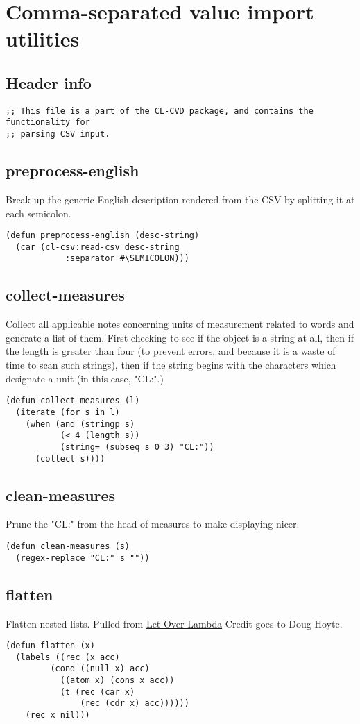 \documentclass[11pt]{article}
\begin{document}
\section{Comma-separated value import utilities}
\label{sec-3}
\subsection{Header info}
\label{sec-3-1}
\begin{verbatim}
;; This file is a part of the CL-CVD package, and contains the functionality for
;; parsing CSV input.
\end{verbatim}
\subsection{preprocess-english}
\label{sec-3-2}
Break up the generic English description rendered from the CSV by
splitting it at each semicolon.
\begin{verbatim}
(defun preprocess-english (desc-string)
  (car (cl-csv:read-csv desc-string
			:separator #\SEMICOLON)))
\end{verbatim}
\subsection{collect-measures}
\label{sec-3-3}
Collect all applicable notes concerning units of measurement related to words
and generate a list of them. First checking to see if the object is a string at
all, then if the length is greater than four (to prevent errors, and because it
is a waste of time to scan such strings), then if the string begins with the
characters which designate a unit (in this case, "CL:".)
\begin{verbatim}
(defun collect-measures (l)
  (iterate (for s in l)
    (when (and (stringp s)
	       (< 4 (length s))
	       (string= (subseq s 0 3) "CL:"))
      (collect s))))
\end{verbatim}
\subsection{clean-measures}
\label{sec-3-4}
Prune the "CL:" from the head of measures to make displaying nicer.
\begin{verbatim}
(defun clean-measures (s)
  (regex-replace "CL:" s ""))
\end{verbatim}
\subsection{flatten}
\label{sec-3-5}
Flatten nested lists. Pulled from \href{http://letoverlambda.com}{Let Over Lambda} Credit goes to Doug Hoyte.
\begin{verbatim}
(defun flatten (x)
  (labels ((rec (x acc)
	     (cond ((null x) acc)
		   ((atom x) (cons x acc))
		   (t (rec (car x)
			   (rec (cdr x) acc))))))
    (rec x nil)))
\end{verbatim}
\end{document}
